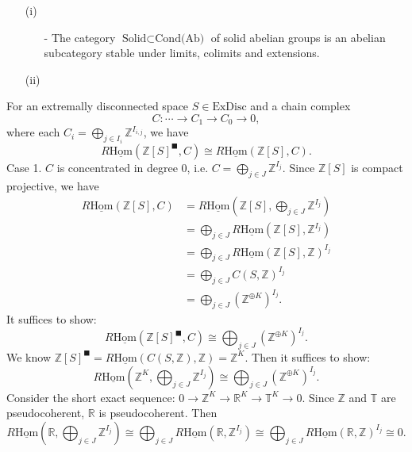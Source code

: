 \documentclass[UTF8,12,a4paper]{ctexart}
\theoremstyle{definition}
\begin{document}
\thm 

\begin{itemize}
	\item [(i)]
	\begin{itemize}
		\item [-]
		The category $\text{Solid}\subset\text{Cond(Ab)}$ of solid abelian groups is an abelian subcategory stable under limits, colimits and extensions.
	\end{itemize}
	\item [(ii)]
\end{itemize}



\prop For an extremally disconnected space $S\in \text{ExDisc}$ and a chain complex 
$$
C: \cdots \rightarrow C_1\rightarrow C_0\rightarrow 0,
$$
where each $C_i=\bigoplus_{j\in I_i} \mathbb{Z}^{I_{i,j}}$, we have
$$
R\underline{\text{Hom}}(\mathbb{Z}[S]^\blacksquare,C)\cong R\underline{\text{Hom}}(\mathbb{Z}[S],C).
$$
\pf 
Case 1. $C$ is concentrated in degree 0, i.e. $C=\bigoplus_{j\in J}\mathbb{Z}^{I_j}.$ Since $\mathbb{Z}[S]$ is compact projective, we have
\begin{align*}
R\underline{\text{Hom}}(\mathbb{Z}[S],C)
&=R\underline{\text{Hom}}(\mathbb{Z}[S],\bigoplus_{j\in J}\mathbb{Z}^{I_j})\\
&=\bigoplus_{j\in J} R\underline{\text{Hom}}(\mathbb{Z}[S],\mathbb{Z}^{I_j})\\
&=\bigoplus_{j\in J}R\underline{\text{Hom}}(\mathbb{Z}[S],\mathbb{Z})^{I_j}\\
&=\bigoplus_{j\in J}C(S,\mathbb{Z})^{I_j}\\
&=\bigoplus_{j\in J}(\mathbb{Z}^{\oplus K})^{I_j}.
\end{align*}
It suffices to show:
$$
R\underline{\text{Hom}}(\mathbb{Z}[S]^\blacksquare,C)\cong\bigoplus_{j\in J}(\mathbb{Z}^{\oplus K})^{I_j}.
$$
We know $\mathbb{Z}[S]^\blacksquare=R\underline{\text{Hom}}(C(S,\mathbb{Z}),\mathbb{Z})=\mathbb{Z}^K$. Then it suffices to show:
$$
R\underline{\text{Hom}}(\mathbb{Z}^K,\bigoplus_{j\in J}\mathbb{Z}^{I_j})\cong\bigoplus_{j\in J}(\mathbb{Z}^{\oplus K})^{I_j}.
$$
Consider the short exact sequence: $0\rightarrow \mathbb{Z}^K\rightarrow \mathbb{R}^K\rightarrow \mathbb{T}^K\rightarrow 0.$ Since $\mathbb{Z}$ and $\mathbb{T}$ are pseudocoherent, $\mathbb{R}$ is pseudocoherent. Then
$$
R\underline{\text{Hom}}(\mathbb{R},\bigoplus_{j\in J}\mathbb{Z}^{I_j})\cong\bigoplus_{j\in J}R\underline{\text{Hom}}(\mathbb{R},\mathbb{Z}^{I_j})
\cong\bigoplus_{j\in J}R\underline{\text{Hom}}(\mathbb{R},\mathbb{Z})^{I_j}\cong 0.
$$
\end{document}
